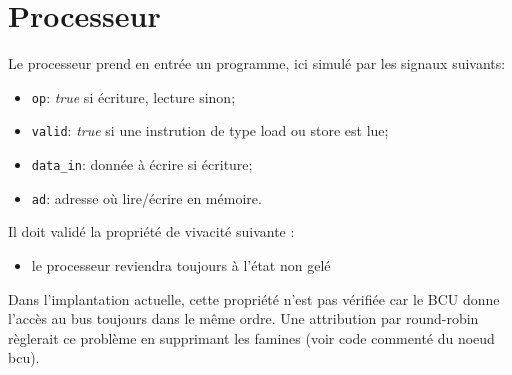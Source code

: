 \documentclass[a4paper, 11pt]{article}
\begin{document}
\section{Processeur}
Le processeur prend en entrée un programme, ici simulé par les signaux suivants:
\begin{itemize}
  \item \texttt{op}: \textit{true} si écriture, lecture sinon;
  \item \texttt{valid}: \textit{true} si une instrution de type load ou store 
    est lue;
  \item \texttt{data\_in}: donnée à écrire si écriture;
  \item \texttt{ad}: adresse où lire/écrire en mémoire.
\end{itemize}
Il doit validé la propriété de vivacité suivante :
\begin{itemize}
  \item le processeur reviendra toujours à l'état non gelé
\end{itemize}
Dans l'implantation actuelle, cette propriété n'est pas vérifiée car le BCU
donne l'accès au bus toujours dans le même ordre. Une attribution par 
round-robin règlerait ce problème en supprimant les famines (voir code 
commenté du noeud bcu).
\end{document}
